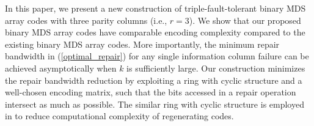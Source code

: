 \documentclass[conference]{IEEEtran}
\begin{document}

In this paper, we present a new construction of triple-fault-tolerant binary
MDS array codes with three parity columns (i.e., $r=3$). We show that our
proposed binary MDS array codes have comparable encoding complexity compared
to the existing binary MDS array codes. More importantly, the minimum repair
bandwidth in (\ref{optimal_repair}) for any single information column failure
can be achieved asymptotically when $k$ is sufficiently large.  Our
construction minimizes the repair bandwidth reduction by exploiting a ring with cyclic
structure and a well-chosen encoding matrix, such that the bits accessed in a
repair operation intersect as much as possible.
The similar ring with cyclic structure is employed in \cite{shumregenerating,Hou2016BASIC} to reduce computational complexity of
regenerating codes.

\end{document}
